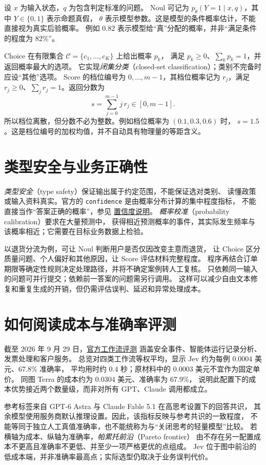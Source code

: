 \documentclass[UTF8,12pt,a4paper,fontset=fandol]{ctexart}
\begin{document}
设 $x$ 为输入状态，$q$ 为包含判定标准的问题。
Noul 可记为 $p_\theta(Y=1\mid x,q)$，其中 $Y\in\{0,1\}$ 表示命题真假，
$\theta$ 表示模型参数。这是模型的条件概率估计，不能直接视为真实后验概率。
例如 $0.82$ 表示模型给“真”分配的概率，并非“满足条件的程度为 82\%”。

Choice 在有限集合 $\mathcal C=\{c_1,\ldots,c_K\}$ 上给出概率 $p_k$，
满足 $p_k\geq0$、$\sum_k p_k=1$，并返回概率最大的选项。
它实现\emph{闭集分类}（closed-set classification）；类别不完备时应设“其他”选项。
Score 的档位编号为 $0,\ldots,m-1$，其档位概率记为 $r_j$，满足
$r_j\geq0$、$\sum_j r_j=1$。返回分数为
\begin{equation}
  s=\sum_{j=0}^{m-1}j\,r_j\in[0,m-1].
  \label{eq:jev-score}
\end{equation}
所以档位离散，但分数不必为整数。例如档位概率为 $(0.1,0.3,0.6)$ 时，
$s=1.5$。这是档位编号的加权均值，并不自动具有物理量的等距含义。

\section{类型安全与业务正确性}
\label{sec:jev-reliability}

\emph{类型安全}（type safety）保证输出属于约定范围，不能保证选对类别、
读懂政策或输入资料真实。官方的 \texttt{confidence} 是由概率分布计算的集中程度指标，
不能直接当作“答案正确的概率”，参见
\href{https://docs.typesafe.ai/confidence}{置信度说明}。
\emph{概率校准}（probability calibration）要求在大量预测中，
获得相近预测概率的事件，其实际发生频率与该概率相近；它需要在目标业务数据上检验。

以退货分流为例，可让 Noul 判断用户是否仅因改变主意而退货，
让 Choice 区分质量问题、个人偏好和其他原因，让 Score 评估材料完整程度。
程序再结合订单期限等确定性规则决定处理路径，并将不确定案例转人工复核。
只依赖同一输入的问题可并行提交；依赖前一答案的问题需另行调用。
这样可以减少自由文本修复和重复生成的开销，但仍需评估误判、延迟和异常处理成本。

\section{如何阅读成本与准确率评测}
\label{sec:jev-evaluation}

截至 2026 年 9 月 29 日，\href{https://evals.typesafe.ai/}{官方工作流评测}
涵盖安全事件、智能体运行记录分析、发票处理和客户服务。
总览对四类工作流等权平均，显示 Jev 约为每例 0.0004 美元、67.8\% 准确率，
平均用时约 0.4 秒；原材料中的 0.0003 美元不宜作为固定单价。
同图 Terra 的成本约为 0.0304 美元、准确率为 67.9\%，
说明此配置下的成本优势接近两个数量级，而非对所有 GPT、Claude 调用都成立。

参考标签来自 GPT-6 Astra 与 Claude Fable 5.1 在高思考设置下的回答共识，
其余模型使用服务商默认推理设置。因此，该指标反映与参考共识的一致程度，
不能等同于独立人工真值准确率，也不能统称为与“关闭思考的轻量模型”比较。
若横轴为成本、纵轴为准确率，\emph{帕累托前沿}（Pareto frontier）
由不存在另一配置成本不更高且准确率不更低、并至少一项严格更优的点组成。
Jev 位于图中前沿的低成本端，并非准确率最高点；实际选型仍取决于业务误判代价。
\end{document}
